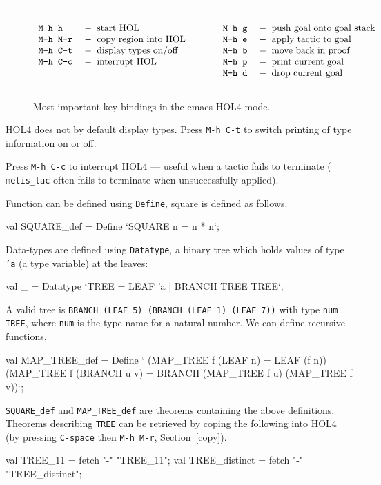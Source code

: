 \documentclass[a4paper,10pt]{article}
\begin{document}
\begin{figure}[t]
\hrule

\begin{displaymath}
\begin{array}{lllll}
\itemy{\itemz{\rule{0em}{1.5em}M-h h}{start HOL}}{\itemz{M-h g}{push goal onto goal stack}}
\itemy{\itemz{M-h M-r}{copy region into HOL}}{\itemz{M-h e}{apply tactic to goal}}
\itemy{\itemz{M-h C-t}{display types on/off}}{\itemz{M-h b}{move back in proof}}
\itemy{\itemz{M-h C-c}{interrupt HOL}}{\itemz{M-h p}{print current goal}}
\itemy{&}{\itemz{M-h d}{drop current goal}}
\end{array}
\end{displaymath}
\caption{Most important key bindings in the emacs HOL4 mode.}

\rule{0em}{1.5em}\hrule
\end{figure}


HOL4 does not by default display types. Press {\tt M-h C-t} to switch
printing of type information on or off.


Press {\tt M-h C-c} to interrupt HOL4 --- useful when a tactic fails to terminate
(\eg{} {\tt\small metis\_tac} often fails to terminate when unsuccessfully applied).


Function can be defined using {\tt Define}, \eg{} square is defined as follows.
\begin{code}
val SQUARE_def = Define `SQUARE n = n * n`;
\end{code}

\noindent
Data-types are defined using {\tt Datatype}, \eg{} a binary tree
which holds values of type {\tt 'a} (a type variable) at the leaves:
\begin{code}
val _ = Datatype `TREE = LEAF 'a | BRANCH TREE TREE`;
\end{code}

\noindent
A valid tree is \eg{} {\tt BRANCH (LEAF 5) (BRANCH (LEAF 1) (LEAF 7))}
with type {\tt num TREE}, where {\tt  num} is the type name for a natural
number. We can define recursive functions, \eg{}
\begin{code}
val MAP_TREE_def = Define `
  (MAP_TREE f (LEAF n) = LEAF (f n)) \conj{}
  (MAP_TREE f (BRANCH u v) = BRANCH (MAP_TREE f u) (MAP_TREE f v))`;
\end{code}
{\tt  SQUARE\_def} and {\tt  MAP\_TREE\_def} are theorems containing the
above definitions. Theorems describing {\tt  TREE} can be retrieved by coping
the following into HOL4 (by pressing {\tt C-space} then {\tt M-h M-r}, Section~\ref{copy}).
\begin{code}
val TREE_11 = fetch "-" "TREE_11";
val TREE_distinct = fetch "-" "TREE_distinct";
\end{code}
\end{document}
